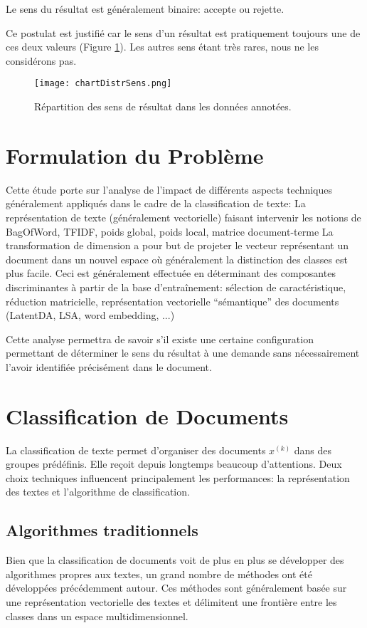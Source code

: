\begin{postulat}\label{postulat:sens:sensbinaire}
Le sens du résultat est généralement binaire: accepte ou rejette.
\end{postulat} 
Ce postulat est justifié car le sens d'un résultat est pratiquement toujours une de ces deux valeurs (Figure \ref{stat-sensrst}). Les autres sens étant très rares, nous ne les considérons pas.

\begin{figure}
\texttt{[image: chartDistrSens.png]}
\caption{Répartition des sens de résultat dans les données annotées.}\label{stat-sensrst}
\end{figure}
\section{Formulation du Problème}
\label{sec:sensresultat:probleme}

Cette étude porte sur l'analyse de l'impact de différents aspects techniques généralement appliqués dans le cadre de la classification de texte:
La représentation de texte (généralement vectorielle) faisant intervenir les notions de BagOfWord, TFIDF, poids global, poids local, matrice document-terme
La transformation de dimension a pour but de projeter le vecteur représentant un document dans un nouvel espace où généralement la distinction des classes est plus facile. Ceci est généralement effectuée en déterminant des composantes discriminantes à partir de la base d'entraînement: sélection de caractéristique, réduction matricielle, représentation vectorielle “sémantique” des documents (LatentDA, LSA, word embedding, ...)

 Cette analyse permettra de savoir s'il existe une certaine configuration permettant de déterminer le sens du résultat à une demande sans nécessairement l'avoir identifiée précisément dans le document. 


\section{Classification de Documents}
\label{sec:sensresultat:biblio_classif}

La classification de texte permet d'organiser des documents $x^{(k)}$ dans des groupes prédéfinis. Elle reçoit depuis longtemps beaucoup d'attentions. Deux choix techniques influencent principalement les performances: la représentation des textes et l'algorithme de classification. 

\subsection{Algorithmes traditionnels}
Bien que la classification de documents voit de plus en plus se développer des algorithmes propres aux textes, un grand nombre de méthodes ont été développées précédemment autour. Ces méthodes sont généralement basée sur une représentation vectorielle des textes et délimitent une frontière entre les classes dans un espace multidimensionnel. 

